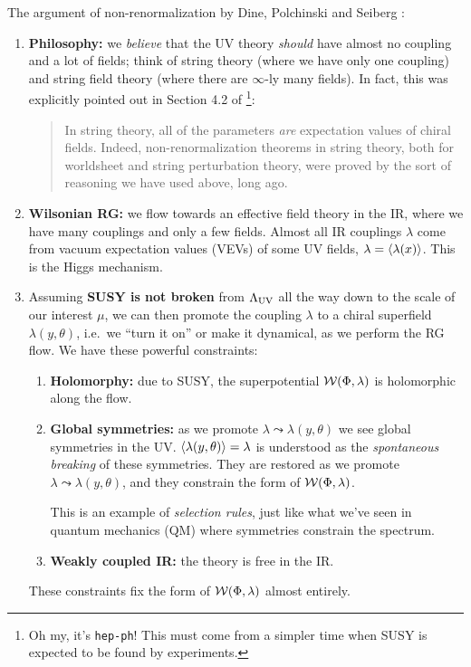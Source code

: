 \documentclass[a4paper
	,10pt
]{article}
\makeatletter
\newcommand{\nobeginpar}{\@beginparpenalty=10000}
\makeatother
\begin{document}
{\nobeginpar
	The argument of non-renormalization by Dine, Polchinski and Seiberg \cite{Seiberg:1993vc}: 
	
	\begin{enumerate}
	\item \textbf{Philosophy:} we \textit{believe} that the UV theory \textit{should} have almost no coupling and a lot of fields; think of string theory (where we have only one coupling) and string field theory (where there are $\infty$-ly many fields). In fact, this was explicitly pointed out in Section 4.2 of \mbox{\textcite{Dine:1996ui}}\footnote{
		Oh my, it's \texttt{hep-ph}! This must come from a simpler time when SUSY is expected to be found by experiments. 
	}:
	
		\begin{quote}
			In string theory, all of the parameters \textit{are} expectation values of chiral fields.
			Indeed, non-renormalization theorems in string theory, both for worldsheet and string perturbation theory, were proved by the sort of reasoning we have used above, long ago. 
		\end{quote}
	
	\item \textbf{Wilsonian RG:} we flow towards an effective field theory in the IR, where we have many couplings and only a few fields. Almost all IR couplings $\lambda$ come from vacuum expectation values (VEVs) of some UV fields, $\lambda = \langle\lambda(x)\rangle$. This is the Higgs mechanism. 
	
	\item Assuming \textbf{SUSY is not broken} from $\Lambda_{\mathrm{UV}}$ all the way down to the scale of our interest $\mu$, we can then promote the coupling $\lambda$ to a chiral superfield $\lambda(y,\theta)$, i.e.~we ``turn it on'' or make it dynamical, as we perform the RG flow. We have these powerful constraints:
	
		\begin{enumerate}
		\item \textbf{Holomorphy:} due to SUSY, the superpotential $\mathcal{W}(\Phi,\lambda)$ is holomorphic along the flow.
		
		
		\item \textbf{Global symmetries:} as we promote $\lambda\leadsto\lambda(y,\theta)$ we see global symmetries in the UV. $\langle\lambda(y,\theta)\rangle = \lambda$ is understood as the \textit{spontaneous breaking} of these symmetries. They are restored as we promote $\lambda\leadsto\lambda(y,\theta)$, and they constrain the form of $\mathcal{W}(\Phi,\lambda)$. 
		
		This is an example of \textit{selection rules}, just like what we've seen in quantum mechanics (QM) where symmetries constrain the spectrum. 
		
		\item \textbf{Weakly coupled IR:} the theory is free in the IR.
		\end{enumerate}
	
	These constraints fix the form of $\mathcal{W}(\Phi,\lambda)$ almost entirely. 
	\end{enumerate}
}
	
\end{document}
